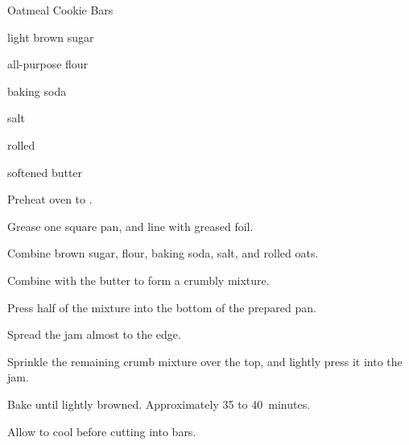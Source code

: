 \begin{recipe}{Oatmeal Cookie Bars}{}{}

\begin{ingredients}
\item \C{\half} light brown sugar
\item {} all-purpose flour
\item \tp{\quarter} baking soda
\item \tp{\eighth} salt
\item {} rolled 
\item \C{\half} softened butter
\item \C{\threequarter} 
\end{ingredients}

\begin{directions}
\item Preheat oven to .
\item Grease one  square pan, and line with greased foil.
\item Combine brown sugar, flour, baking soda, salt, and rolled oats.
\item Combine with the butter to form a crumbly mixture.
\item Press half of the mixture into the bottom of the prepared pan.
\item Spread the jam almost to the edge.
\item Sprinkle the remaining crumb mixture over the top, and lightly press it into the jam.
\item Bake until lightly browned. Approximately 35 to 40~minutes.
\item Allow to cool before cutting into bars.
\end{directions}
\end{recipe}

